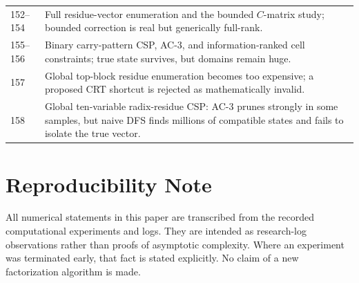 \documentclass[11pt,a4paper]{article}
\begin{document}
\begin{longtable}{@{}p{}p{}@{}}
152--154 & Full residue-vector enumeration and the bounded \(C\)-matrix study; bounded correction is real but generically full-rank.\\
155--156 & Binary carry-pattern CSP, AC-3, and information-ranked cell constraints; true state survives, but domains remain huge.\\
157 & Global top-block residue enumeration becomes too expensive; a proposed CRT shortcut is rejected as mathematically invalid.\\
158 & Global ten-variable radix-residue CSP: AC-3 prunes strongly in some samples, but naive DFS finds millions of compatible states and fails to isolate the true vector.\\
\bottomrule
\end{longtable}

\section*{Reproducibility Note}
All numerical statements in this paper are transcribed from the recorded computational experiments and logs. They are intended as research-log observations rather than proofs of asymptotic complexity. Where an experiment was terminated early, that fact is stated explicitly. No claim of a new factorization algorithm is made.
\end{document}
